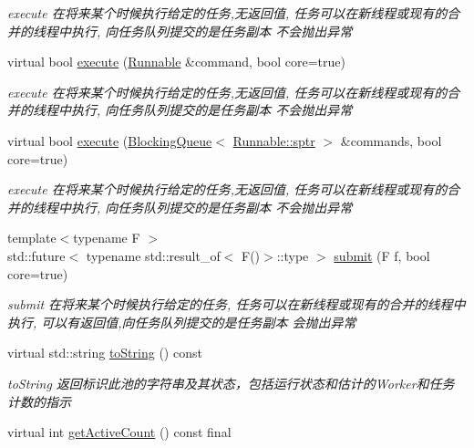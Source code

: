 \begin{DoxyCompactItemize}
\begin{DoxyCompactList}\small\item\em execute 在将来某个时候执行给定的任务,无返回值, 任务可以在新线程或现有的合并的线程中执行, 向任务队列提交的是任务副本 不会抛出异常 \end{DoxyCompactList}\item 
virtual bool \hyperlink{classThreadPoolExecutor_a523df0545790ef03a82623b05e3b20f9}{execute} (\hyperlink{classRunnable}{Runnable} \&command, bool core=true)
\begin{DoxyCompactList}\small\item\em execute 在将来某个时候执行给定的任务,无返回值, 任务可以在新线程或现有的合并的线程中执行, 向任务队列提交的是任务副本 不会抛出异常 \end{DoxyCompactList}\item 
virtual bool \hyperlink{classThreadPoolExecutor_a451bba3f90dbed2ba7e491ebc391b3c6}{execute} (\hyperlink{classBlockingQueue}{Blocking\+Queue}$<$ \hyperlink{classRunnable_abe8d3066c7305401d6f0aad8e70780f2}{Runnable\+::sptr} $>$ \&commands, bool core=true)
\begin{DoxyCompactList}\small\item\em execute 在将来某个时候执行给定的任务,无返回值, 任务可以在新线程或现有的合并的线程中执行, 向任务队列提交的是任务副本 不会抛出异常 \end{DoxyCompactList}\item 
{\footnotesize template$<$typename F $>$ }\\std\+::future$<$ typename std\+::result\+\_\+of$<$ F()$>$\+::type $>$ \hyperlink{classThreadPoolExecutor_a94834ab6bedcc75111524fec4e928b3f}{submit} (F f, bool core=true)
\begin{DoxyCompactList}\small\item\em submit 在将来某个时候执行给定的任务, 任务可以在新线程或现有的合并的线程中执行, 可以有返回值,向任务队列提交的是任务副本 会抛出异常 \end{DoxyCompactList}\item 
virtual std\+::string \hyperlink{classThreadPoolExecutor_a8e340cec3bb976f7773db103d73189c2}{to\+String} () const
\begin{DoxyCompactList}\small\item\em to\+String 返回标识此池的字符串及其状态，包括运行状态和估计的\+Worker和任务计数的指示 \end{DoxyCompactList}\item 
virtual int \hyperlink{classThreadPoolExecutor_ac9345329aa167200bec31951d2f5a690}{get\+Active\+Count} () const final

\end{DoxyCompactItemize}
